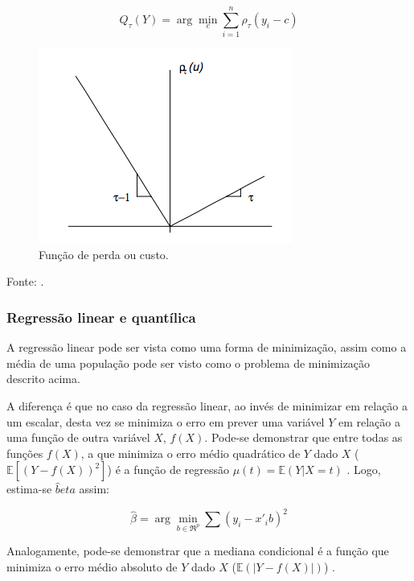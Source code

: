 \documentclass[a4paper, 12pt]{article}
\newcommand{\bcenter}{\begin{center}}
\newcommand{\ecenter}{\end{center}}
\begin{document}
\[Q_\tau(Y) = \arg \min_c \sum_{i = 1}^n \rho_\tau(y_i - c)\]

\begin{figure}[H]

{\centering \includegraphics[width=0.7\linewidth]{DmKq7} 

}

\caption{Função de perda ou custo.}\label{fig:custo}
\end{figure}

\bcenter Fonte: \textcite{qr}. \ecenter

\hypertarget{regressao-linear-e-quantilica}{%
\subsubsection{Regressão linear e
quantílica}\label{regressao-linear-e-quantilica}}

A regressão linear pode ser vista como uma forma de minimização, assim
como a média de uma população pode ser visto como o problema de
minimização descrito acima.

A diferença é que no caso da regressão linear, ao invés de minimizar em
relação a um escalar, desta vez se minimiza o erro em prever uma
variável \(Y\) em relação a uma função de outra variável \(X\),
\(f(X)\). Pode-se demonstrar que entre todas as funções \(f(X)\), a que
minimiza o erro médio quadrático de \(Y\) dado \(X\)
(\(\mathbb{E}[(Y - f(X))^2]\)) é a função de regressão
\(\mu(t) = \mathbb{E}(Y|X=t)\) \autocite[49-50]{matloff2017}. Logo,
estima-se \(\hat beta\) assim:

\[\hat \beta = \arg \min_{b \in \mathfrak{R}^p}\sum (y_i - x'_ib)^2\]

Analogamente, pode-se demonstrar que a mediana condicional é a função
que minimiza o erro médio absoluto de \(Y\) dado \(X\)
(\(\mathbb{E}(|Y-f(X)|)\)) \autocite[260-261]{matloff2017}.
\end{document}
